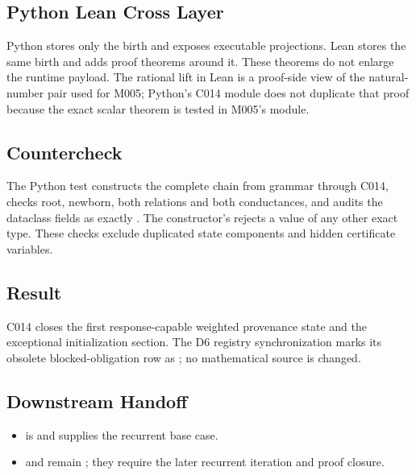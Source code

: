 \subsection{Python Lean Cross Layer}\label{python-lean-cross-layer-4}

Python stores only the birth and exposes executable projections. Lean
stores the same birth and adds proof theorems around it. These theorems
do not enlarge the runtime payload. The rational lift in Lean is a
proof-side view of the natural-number pair used for M005; Python's C014
module does not duplicate that proof because the exact scalar theorem is
tested in M005's module.

\subsection{Countercheck}\label{countercheck-4}

The Python test constructs the complete chain from grammar through C014,
checks root, newborn, both relations and both conductances, and audits
the dataclass fields as exactly \texttt{\protect{}}. The constructor's
\texttt{\protect{}} rejects a value of any other exact type.
These checks exclude duplicated state components and hidden certificate
variables.

\subsection{Result}\label{result-13}

C014 closes the first response-capable weighted provenance state and the
exceptional initialization section. The D6 registry synchronization
marks its obsolete blocked-obligation row as \texttt{\protect{}};
no mathematical source is changed.

\subsection{Downstream Handoff}\label{downstream-handoff-13}

\begin{itemize}
\tightlist
\item
  \texttt{\protect{}} is
  \texttt{\protect{}} and supplies the recurrent base case.
\item
  \texttt{\protect{}} and
  \texttt{\protect{}} remain
  \texttt{\protect{}}; they require the later recurrent iteration
  and proof closure.
\end{itemize}

